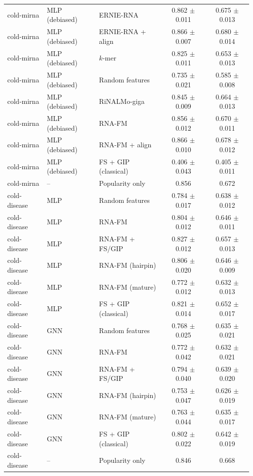 \begin{longtable}{lllcc}
cold-mirna & MLP (debiased) & ERNIE-RNA & 0.862 $\pm$ 0.011 & 0.675 $\pm$ 0.013\\
cold-mirna & MLP (debiased) & ERNIE-RNA + align & 0.866 $\pm$ 0.007 & 0.680 $\pm$ 0.014\\
cold-mirna & MLP (debiased) & $k$-mer & 0.825 $\pm$ 0.011 & 0.653 $\pm$ 0.013\\
cold-mirna & MLP (debiased) & Random features & 0.735 $\pm$ 0.021 & 0.585 $\pm$ 0.008\\
cold-mirna & MLP (debiased) & RiNALMo-giga & 0.845 $\pm$ 0.009 & 0.664 $\pm$ 0.013\\
cold-mirna & MLP (debiased) & RNA-FM & 0.856 $\pm$ 0.012 & 0.670 $\pm$ 0.011\\
cold-mirna & MLP (debiased) & RNA-FM + align & 0.866 $\pm$ 0.010 & 0.678 $\pm$ 0.012\\
cold-mirna & MLP (debiased) & FS + GIP (classical) & 0.406 $\pm$ 0.043 & 0.405 $\pm$ 0.011\\
cold-mirna & -- & Popularity only & 0.856 & 0.672\\\midrule
cold-disease & MLP & Random features & 0.784 $\pm$ 0.017 & 0.638 $\pm$ 0.012\\
cold-disease & MLP & RNA-FM & 0.804 $\pm$ 0.012 & 0.646 $\pm$ 0.011\\
cold-disease & MLP & RNA-FM + FS/GIP & 0.827 $\pm$ 0.012 & 0.657 $\pm$ 0.013\\
cold-disease & MLP & RNA-FM (hairpin) & 0.806 $\pm$ 0.020 & 0.646 $\pm$ 0.009\\
cold-disease & MLP & RNA-FM (mature) & 0.772 $\pm$ 0.012 & 0.632 $\pm$ 0.013\\
cold-disease & MLP & FS + GIP (classical) & 0.821 $\pm$ 0.014 & 0.652 $\pm$ 0.017\\
cold-disease & GNN & Random features & 0.768 $\pm$ 0.025 & 0.635 $\pm$ 0.021\\
cold-disease & GNN & RNA-FM & 0.772 $\pm$ 0.042 & 0.632 $\pm$ 0.021\\
cold-disease & GNN & RNA-FM + FS/GIP & 0.794 $\pm$ 0.040 & 0.639 $\pm$ 0.020\\
cold-disease & GNN & RNA-FM (hairpin) & 0.753 $\pm$ 0.047 & 0.626 $\pm$ 0.019\\
cold-disease & GNN & RNA-FM (mature) & 0.763 $\pm$ 0.044 & 0.635 $\pm$ 0.017\\
cold-disease & GNN & FS + GIP (classical) & 0.802 $\pm$ 0.022 & 0.642 $\pm$ 0.019\\
cold-disease & -- & Popularity only & 0.846 & 0.668\\\midrule
\bottomrule\end{longtable}